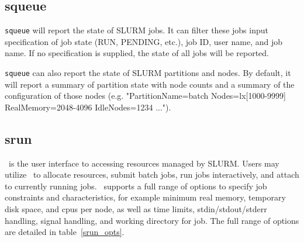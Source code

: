 \subsection{squeue}

{\tt squeue} will report the state of SLURM jobs.  It can filter these
jobs input specification of job state (RUN, PENDING, etc.), job ID,
user name, and job name.  If no specification is supplied, the state of
all jobs will be reported.

{\tt squeue} can also report the state of SLURM partitions and nodes.  By
default, it will report a summary of partition state with node counts and
a summary of the configuration of those nodes (e.g.  "PartitionName=batch
Nodes=lx[1000-9999] RealMemory=2048-4096 IdleNodes=1234 ...").

\subsection{srun}

\srun\ is the user interface to accessing resources managed by SLURM.
Users may utilize \srun\ to allocate resources, submit batch jobs, 
run jobs interactively, and attach to currently running jobs. \srun\ 
supports a full range of options to specify job constraints and
characteristics, for example minimum real memory, temporary disk space,
and cpus per node, as well as time limits, stdin/stdout/stderr 
handling, signal handling, and working directory for job.
The full range of options are detailed in table~\ref{srun_opts}.

